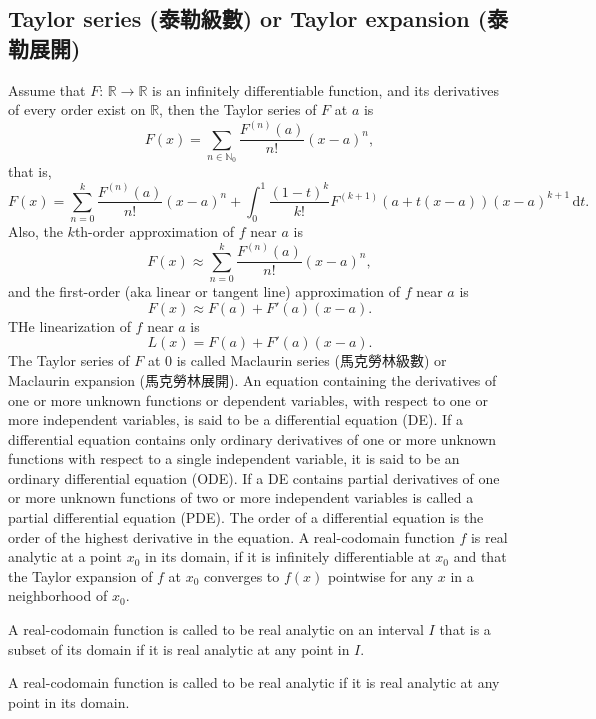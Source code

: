 \documentclass[a4paper,12pt]{report}
\begin{document}
\begin{itemize}
\begin{itemize}
\subsection{Taylor series (泰勒級數) or Taylor expansion (泰勒展開)}
Assume that $F:\,\mathbb{R}\to\mathbb{R}$ is an infinitely differentiable function, and its derivatives of every order exist on $\mathbb{R}$, then the Taylor series of $F$ at $a$ is
\[F(x) = \sum_{n\in\mathbb{N}_0} \frac{F^{(n)}(a)}{n!}(x-a)^n,\]
that is,
\[F(x) = \sum^k_{n=0} \frac{F^{(n)}(a)}{n!}(x-a)^n+\int_0^1\frac{(1-t)^k}{k!}F^{(k+1)}(a+t(x-a))(x-a)^{k+1}\,\mathrm{d}t.\]
Also, the $k$th-order approximation of $f$ near $a$ is
\[F(x) \approx \sum^k_{n=0} \frac{F^{(n)}(a)}{n!}(x-a)^n,\]
and the first-order (aka linear or tangent line) approximation of $f$ near $a$ is
\[F(x) \approx F(a)+F'(a)(x-a).\]
THe linearization of $f$ near $a$ is
\[L(x)=F(a)+F'(a)(x-a).\]
The Taylor series of $F$ at $0$ is called Maclaurin series (馬克勞林級數) or Maclaurin expansion (馬克勞林展開).
An equation containing the derivatives of one or more unknown functions or dependent variables, with respect to one or more independent variables, is said to be a differential equation (DE).
If a differential equation contains only ordinary derivatives of one or more unknown functions with respect to a single independent variable, it is said to be an ordinary differential equation (ODE).
If a DE contains partial derivatives of one or more unknown functions of two or more independent variables is called a partial differential equation (PDE).
The order of a differential equation is the order of the highest derivative in the equation.
A real-codomain function $f$ is real analytic at a point $x_0$ in its domain, if it is infinitely differentiable at $x_0$ and that the Taylor expansion of $f$ at $x_0$ converges to $f(x)$ pointwise for any $x$ in a neighborhood of $x_0$.

A real-codomain function is called to be real analytic on an interval $I$ that is a subset of its domain if it is real analytic at any point in $I$.

A real-codomain function is called to be real analytic if it is real analytic at any point in its domain.




\end{itemize}
\end{itemize}
\end{document}
